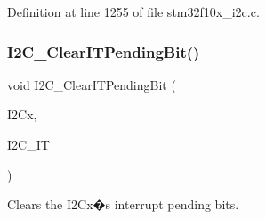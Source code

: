 Definition at line 1255 of file stm32f10x\+\_\+i2c.\+c.

\mbox{\label{group___i2_c___private___functions_ga110dda440fa200b5f77349df19b3e6bb}} 
\subsubsection{\texorpdfstring{I2\+C\+\_\+\+Clear\+I\+T\+Pending\+Bit()}{I2C\_ClearITPendingBit()}}
{\footnotesize\ttfamily void I2\+C\+\_\+\+Clear\+I\+T\+Pending\+Bit (\begin{DoxyParamCaption}\item[{\hyperlink{struct_i2_c___type_def}{I2\+C\+\_\+\+Type\+Def} $\ast$}]{I2\+Cx,  }\item[{uint32\+\_\+t}]{I2\+C\+\_\+\+IT }\end{DoxyParamCaption})}



Clears the I2\+Cx�s interrupt pending bits. 


